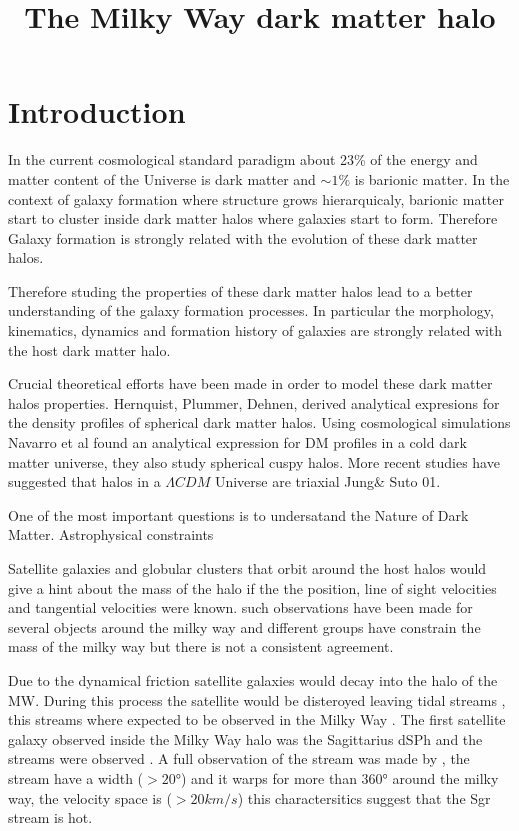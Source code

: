 \documentclass[12pt]{article}
\title{\begin{LARGE}
{The Milky Way dark matter halo}
\end{LARGE}}
\begin{document}
\maketitle

\section{Introduction}

In the current cosmological standard paradigm about 23\% of the energy and matter
content of the Universe is dark matter and $\sim 1\%$ is barionic matter. In the
context of galaxy formation where structure grows hierarquicaly, barionic matter
start to cluster inside dark matter halos where galaxies start to form. Therefore
Galaxy formation is strongly related with the evolution of these dark matter halos. 



Therefore studing the properties of these dark matter halos lead to a better understanding
of the galaxy formation processes. In particular the morphology, kinematics, dynamics
and formation history of galaxies are strongly related with the host dark matter halo. 


     
Crucial theoretical efforts have been made in order to model these dark matter halos 
properties. Hernquist, Plummer, Dehnen, derived analytical expresions for the density 
profiles of spherical dark matter halos. Using cosmological simulations Navarro et al 
found an analytical expression for DM profiles in a cold dark matter universe, they also 
study spherical cuspy halos. More recent studies have suggested that halos in a 
$\Lambda CDM$ Universe are triaxial Jung\& Suto 01. 

One of the most important questions is to undersatand the Nature of Dark Matter. Astrophysical 
constraints    

Satellite galaxies and globular clusters that orbit around the host halos would give 
a hint about the mass of the halo if the the position, line of sight velocities and tangential velocities
were known. such observations have been made for several objects around the milky way and 
different groups have constrain the mass of the milky way but there is not a consistent 
agreement.  

Due to the dynamical friction satellite galaxies would decay into the halo of the MW. During this 
process the satellite would be disteroyed leaving tidal streams \citep{toomretoomre72}, 
this streams where expected to be observed in the Milky Way \citep{lblb95, jhonston96}. 
The first satellite galaxy observed inside the Milky Way halo was the Sagittarius dSPh \citep{ibata94} 
and the streams were observed \citep{ivezic00, yanny00, ibata01b}. A full observation 
of the stream was made by \citep{majewsky03}, the stream  have a width ($>20°$) \citep{belokurov06} and it warps
for more than $360°$\citep{majewsky03, piladiaz13, belokurov14} around the milky way, 
the velocity space is ($>20km/s$) \citep{koposov13} this charactersitics suggest that
the Sgr stream is hot. 
\end{document}
